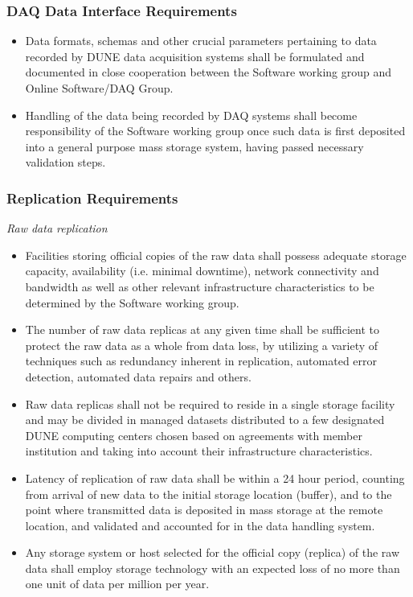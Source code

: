 \subsubsection{DAQ Data Interface Requirements}
\begin{itemize}
\item Data formats, schemas and other crucial parameters pertaining to data recorded by DUNE  data acquisition systems shall 
be formulated and documented in close cooperation between the Software working group and Online Software/DAQ Group.

\item Handling of the data being recorded by DAQ systems shall become responsibility of the Software working group once such 
data is first deposited into a general purpose mass storage system, having passed necessary validation steps.

\end{itemize}

\subsubsection{Replication Requirements}
\textit{Raw data replication}

\begin{itemize}
\item Facilities storing official copies of the raw data shall possess adequate storage capacity, availability (i.e. minimal downtime), network connectivity and bandwidth as well as other relevant infrastructure characteristics to be determined by the Software working group.

\item The number of raw data replicas at any given time shall be sufficient to protect the raw data as a whole from data loss, by utilizing a variety of techniques such as redundancy inherent in replication, automated error detection, automated data repairs and others.


\item Raw data replicas shall not be required to reside in a single storage facility and may be divided in managed datasets distributed to a few designated DUNE computing centers chosen based on agreements with member institution and taking into account their infrastructure characteristics.

\item Latency of replication of raw data shall be within a 24 hour period, counting from arrival of new data to the initial storage location (buffer), and to the point where transmitted data is deposited in mass storage at the remote location, and validated and accounted for in the data handling system.

\item Any storage system or host selected for the official copy (replica) of the raw data shall employ storage technology with an expected loss of no more than one unit of data per million per year.

\end{itemize}

